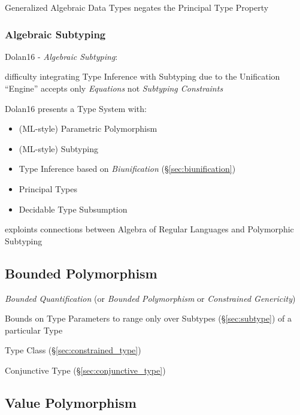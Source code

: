 Generalized Algebraic Data Types negates the Principal Type Property



\subsubsection{Algebraic Subtyping}\label{sec:algebraic_subtyping}

Dolan16 - \emph{Algebraic Subtyping}:

difficulty integrating Type Inference with Subtyping due to the
Unification ``Engine'' accepts only \emph{Equations} not
\emph{Subtyping Constraints}

Dolan16 presents a Type System with:
\begin{itemize}
  \item (ML-style) Parametric Polymorphism
  \item (ML-style) Subtyping
  \item Type Inference based on \emph{Biunification}
    (\S\ref{sec:biunification})
  \item Principal Types
  \item Decidable Type Subsumption
\end{itemize}

exploints connections between Algebra of Regular Languages and
Polymorphic Subtyping



\subsection{Bounded Polymorphism}\label{sec:bounded_polymorphism}

\emph{Bounded Quantification} (or \emph{Bounded Polymorphism} or
\emph{Constrained Genericity})

Bounds on Type Parameters to range only over Subtypes
(\S\ref{sec:subtype}) of a particular Type

Type Class (\S\ref{sec:constrained_type})

Conjunctive Type (\S\ref{sec:conjunctive_type})



\subsection{Value Polymorphism}\label{sec:value_polymorphism}

